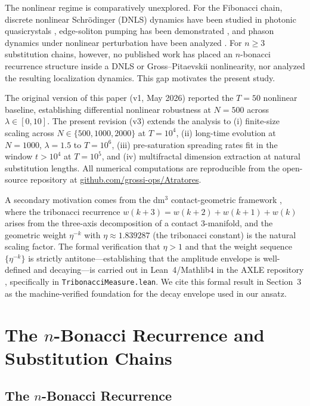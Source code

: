 \documentclass[12pt,a4paper]{article}
\begin{document}
The nonlinear regime is comparatively unexplored. For the Fibonacci chain,
discrete nonlinear Schr\"{o}dinger (DNLS) dynamics have been studied in
photonic quasicrystals \cite{Lahini2009}, edge-soliton pumping has been
demonstrated \cite{Jurgensen2021}, and phason dynamics under nonlinear
perturbation have been analyzed \cite{Verbin2015}. For $n \geq 3$
substitution chains, however, no published work has placed an $n$-bonacci
recurrence structure inside a DNLS or Gross--Pitaevskii nonlinearity, nor
analyzed the resulting localization dynamics. This gap motivates the present
study.

The original version of this paper (v1, May 2026) reported the $T=50$
nonlinear baseline, establishing differential nonlinear robustness at
$N=500$ across $\lambda \in [0,10]$. The present revision (v3) extends the
analysis to (i) finite-size scaling across $N \in \{500, 1000, 2000\}$ at
$T=10^4$, (ii) long-time evolution at $N=1000$, $\lambda=1.5$ to
$T=10^6$, (iii) pre-saturation spreading rates fit in the window
$t > 10^4$ at $T=10^5$, and (iv) multifractal dimension extraction at
natural substitution lengths. All numerical computations are reproducible
from the open-source repository at
\href{https://github.com/grossi-ops/Atratores}{github.com/grossi-ops/Atratores}.

A secondary motivation comes from the dm$^3$ contact-geometric framework
\cite{Grossi2026_Vol1,Grossi2026_Wavenumber6}, where the tribonacci
recurrence $w(k+3) = w(k+2) + w(k+1) + w(k)$ arises from the three-axis
decomposition of a contact 3-manifold, and the geometric weight $\eta^{-k}$
with $\eta \approx 1.839287$ (the tribonacci constant) is the natural scaling
factor. The formal verification that $\eta > 1$ and that the weight sequence
$\{\eta^{-k}\}$ is strictly antitone---establishing that the amplitude
envelope is well-defined and decaying---is carried out in Lean~4/Mathlib4 in
the AXLE repository \cite{AXLE2026}, specifically in
\texttt{TribonacciMeasure.lean}. We cite this formal result in Section~3 as
the machine-verified foundation for the decay envelope used in our ansatz.

\section{The $n$-Bonacci Recurrence and Substitution Chains}

\subsection{The $n$-Bonacci Recurrence}
\end{document}
